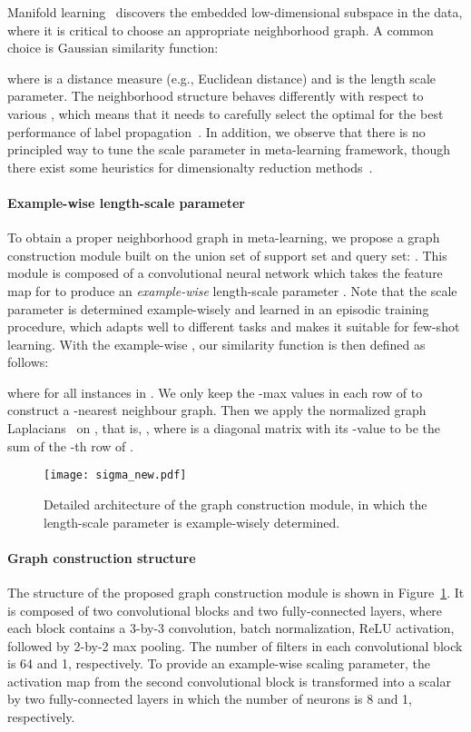\documentclass{article} \usepackage{iclr2019_conference,times}
\begin{document}
Manifold learning~\citep{spectral,labelprop1,revisiting} discovers the embedded low-dimensional
subspace in the data, where it is critical to choose an appropriate neighborhood graph.
A common choice is Gaussian similarity function:

where  is a distance measure (e.g., Euclidean distance) and  is the length scale parameter. The neighborhood structure behaves differently with respect to various ,
which means that it needs to carefully select the optimal  for the best
performance of label propagation~\citep{labelprop2,labelprop3}.
In addition, we observe that there is no principled way to tune the scale
parameter in meta-learning framework, though there exist some heuristics for 
dimensionalty reduction methods~\citep{localscaling,lfda}.



\paragraph{Example-wise length-scale parameter} To obtain a proper neighborhood graph in meta-learning, we propose a graph construction module built on the union set of support set and query set: . 
This module is composed of a convolutional neural network  which takes the 
feature map  for  to produce an \emph{example-wise} length-scale parameter 
. Note that the scale parameter is determined example-wisely and 
learned in an episodic training procedure, which adapts well to different tasks and makes it suitable for few-shot learning. With the example-wise , our similarity function is then defined as follows:

where  for all instances in . We only keep the -max values in each row of  to construct a -nearest neighbour graph. Then we apply the normalized graph Laplacians~\citep{spectral} on , that is,  , where 
 is a diagonal matrix with its -value to be the sum of the -th row of . 

\begin{figure}[ht]
  \centering
  \texttt{[image: sigma\_new.pdf]}
  \caption{Detailed architecture of the graph construction module, 
  in which the length-scale parameter is example-wisely determined.}
  \label{construct}
\end{figure}

\paragraph{Graph construction structure} The structure of the proposed graph construction module is shown in Figure~\ref{construct}. It is composed of two convolutional blocks and two fully-connected layers, where each block contains a 3-by-3 convolution, batch normalization, ReLU activation, followed by 2-by-2 max pooling. The number of filters in each convolutional block is 64 and 1, respectively. To provide an example-wise scaling parameter, the activation map from the second convolutional block is transformed into a scalar by two fully-connected layers in which the number of neurons is 8 and 1, respectively.
\end{document}
